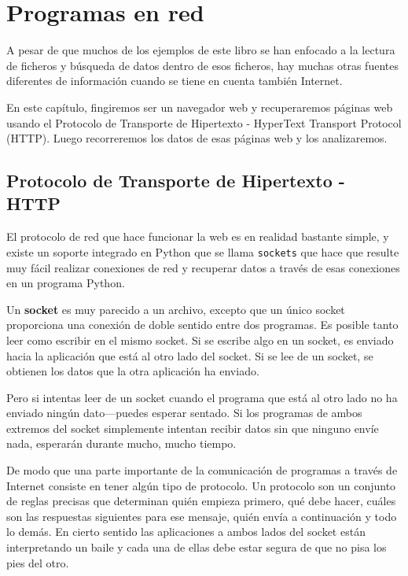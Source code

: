
\chapter{Programas en red}

A pesar de que muchos de los ejemplos de este libro se han enfocado a la lectura
de ficheros y búsqueda de datos dentro de esos ficheros, hay muchas otras fuentes
diferentes de información cuando se tiene en cuenta también Internet.

En este capítulo, fingiremos ser un navegador web y recuperaremos páginas
web usando el Protocolo de Transporte de Hipertexto - HyperText Transport Protocol (HTTP).
Luego recorreremos los datos de esas páginas web y los analizaremos.

\section{Protocolo de Transporte de Hipertexto - HTTP}

El protocolo de red que hace funcionar la web es en realidad bastante simple, y
existe un soporte integrado en Python que se llama {\tt sockets} que hace que resulte muy
fácil realizar conexiones de red y recuperar datos a través de esas
conexiones en un programa Python.

Un {\bf socket} es muy parecido a un archivo, excepto que un único socket
proporciona una conexión de doble sentido entre dos programas.
Es posible tanto leer como escribir en el mismo socket. Si se escribe algo en
un socket, es enviado hacia la aplicación que está al otro lado del socket. Si se lee
de un socket, se obtienen los datos que la otra aplicación ha enviado.

Pero si intentas leer de un socket cuando el programa que está al otro lado
no ha enviado ningún dato---puedes esperar sentado. Si los programas de ambos extremos
del socket simplemente intentan recibir datos sin que ninguno envíe nada, esperarán durante mucho,
mucho tiempo.

De modo que una parte importante de la comunicación de programas a través de Internet consiste en tener algún
tipo de protocolo. Un protocolo son un conjunto de reglas precisas que determinan quién
empieza primero, qué debe hacer, cuáles son las respuestas siguientes para ese mensaje,
quién envía a continuación y todo lo demás. En cierto sentido las aplicaciones a ambos lados del
socket están interpretando un baile y cada una de ellas debe estar segura de que no pisa
los pies del otro.


